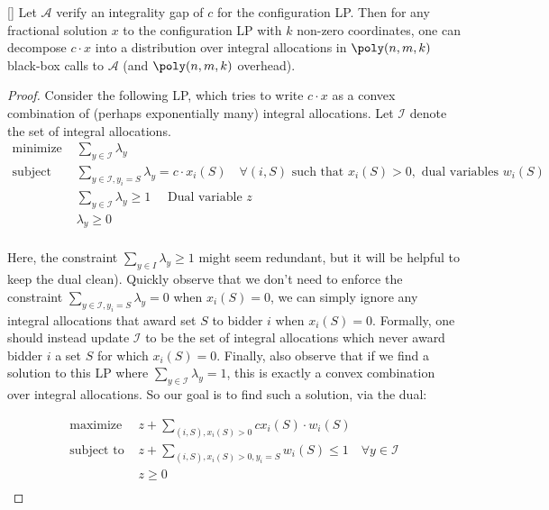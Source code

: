 \begin{proposition}\label{prop:LS}[\cite{LaviS05}] Let $\mathcal{A}$ verify an integrality gap of $c$ for the configuration LP. Then for any fractional solution $x$ to the configuration LP with $k$ non-zero coordinates, one can decompose $c \cdot x$ into a distribution over integral allocations in $\poly(n, m, k)$ black-box calls to $\mathcal{A}$ (and $\poly(n, m, k)$ overhead).
\end{proposition}

\begin{proof}
Consider the following LP, which tries to write $c\cdot x$ as a convex combination of (perhaps exponentially many) integral allocations. Let $\mathcal{I}$ denote the set of integral allocations. 
\begin{align*}
\text{minimize } &\sum_{y \in \mathcal{I}} \lambda_y\\
\text{subject to } &\sum_{y \in \mathcal{I}, y_i=S} \lambda_y = c\cdot x_i(S)\quad \forall (i,S) \text{ such that } x_i(S) > 0, \text{ dual variables } w_i(S)\\
& \sum_{y \in \mathcal{I}} \lambda_y \geq 1 \quad \text{ Dual variable } z\\
&\lambda_y \geq 0\\
\end{align*}

Here, the constraint $\sum_{y\in I} \lambda_y \geq 1$ might seem redundant, but it will be helpful to keep the dual clean).
Quickly observe that we don't need to enforce the constraint $\sum_{y \in \mathcal{I}, y_i=S} \lambda_y  = 0$ when $x_i(S) = 0$, we can simply ignore any integral allocations that award set $S$ to bidder $i$ when $x_i(S) = 0$. Formally, one should instead update $\mathcal{I}$ to be the set of integral allocations which never award bidder $i$ a set $S$ for which $x_i(S) = 0$. Finally, also observe that if we find a solution to this LP where $\sum_{y \in \mathcal{I}} \lambda_y = 1$, this is exactly a convex combination over integral allocations. So our goal is to find such a solution, via the dual:

\begin{align*}
\text{maximize } &z+\sum_{(i, S),x_i(S) > 0} cx_i(S) \cdot w_i(S)\\
\text{subject to } &z+\sum_{(i,S), x_i(S) > 0, y_i=S} w_i(S)\leq 1\quad \forall y \in \mathcal{I}\\
&z \geq 0\\
\end{align*}


\end{proof}

